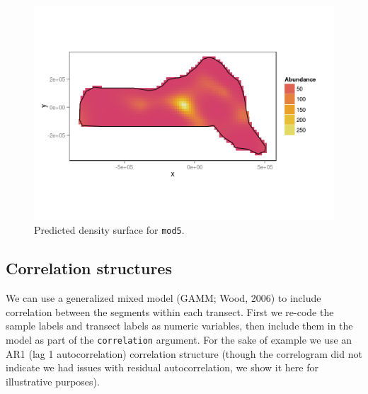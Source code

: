 \documentclass[]{article}
\newenvironment{Shaded}{}{}
\newcommand{\KeywordTok}[1]{\textcolor[rgb]{0.00,0.44,0.13}{\textbf{{#1}}}}
\newcommand{\DataTypeTok}[1]{\textcolor[rgb]{0.56,0.13,0.00}{{#1}}}
\newcommand{\StringTok}[1]{\textcolor[rgb]{0.25,0.44,0.63}{{#1}}}
\newcommand{\NormalTok}[1]{{#1}}
\begin{document}
\begin{figure}[htbp]
\centering
\includegraphics{mexico-figs/mod5-pred.png}
\caption{Predicted density surface for \texttt{mod5}.}
\end{figure}

\subsection{Correlation structures}\label{correlation-structures}

We can use a generalized mixed model (GAMM; Wood, 2006) to include
correlation between the segments within each transect. First we re-code
the sample labels and transect labels as numeric variables, then include
them in the model as part of the \texttt{correlation} argument. For the
sake of example we use an AR1 (lag 1 autocorrelation) correlation
structure (though the correlogram did not indicate we had issues with
residual autocorrelation, we show it here for illustrative purposes).

\begin{Shaded}
\end{Shaded}
\end{document}
